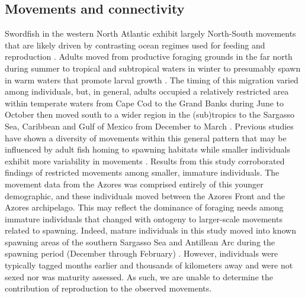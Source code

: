 \subsection{Movements and connectivity}%

Swordfish in the western North Atlantic exhibit largely North-South movements that are likely driven by contrasting ocean regimes used for feeding and reproduction \citep{Sedberry2001, Abascal2015}. Adults moved from productive foraging grounds in the far north during summer to tropical and subtropical waters in winter to presumably spawn in warm waters that promote larval growth \citep{Arocha1995}. The timing of this migration varied among individuals, but, in general, adults occupied a relatively restricted area within temperate waters from Cape Cod to the Grand Banks during June to October then moved south to a wider region in the (sub)tropics to the Sargasso Sea, Caribbean and Gulf of Mexico from December to March \citep{Neilson2009}. Previous studies have shown a diversity of movements within this general pattern that may be influenced by adult fish homing to spawning habitats \citep{Neilson2009} while smaller individuals exhibit more variability in movements \citep{Abascal2015}. Results from this study corroborated findings of restricted movements among smaller, immature individuals. The movement data from the Azores was comprised entirely of this younger demographic, and these individuals moved between the Azores Front and the Azores archipelago. This may reflect the dominance of foraging needs among immature individuals that changed with ontogeny to larger-scale movements related to spawning. Indeed, mature individuals in this study moved into known spawning areas of the southern Sargasso Sea and Antillean Arc during the spawning period (December through February) \citep{Neilson2013}. However, individuals were typically tagged months earlier and thousands of kilometers away and were not sexed nor was maturity assessed. As such, we are unable to determine the contribution of reproduction to the observed movements.

